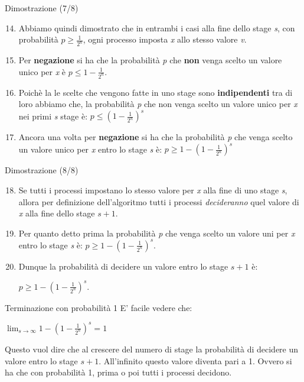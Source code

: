 \documentclass{beamer}
\begin{document}
\begin{frame}{Dimostrazione (7/8)}
    \begin{enumerate}
        \setcounter{enumi}{13}
        \item Abbiamo quindi dimostrato che in entrambi i casi alla fine dello stage \textit{s}, con probabilità $p \geq \frac{1}{2^n}$, ogni processo imposta \textit{x} allo stesso valore \textit{v}.
        \item Per \textbf{negazione} si ha che la probabilità \textit{p} che \textbf{non} venga scelto un valore unico per \textit{x} è $p \leq 1 - \frac{1}{2^n}$.
        \item Poichè la le scelte che vengono fatte in uno stage sono \textbf{indipendenti} tra di loro abbiamo che, la probabilità \textit{p} che non venga scelto un valore unico per \textit{x} nei primi \textit{s} stage è: $p \leq (1 - \frac{1}{2^n})^s$
        \item Ancora una volta per \textbf{negazione} si ha che la probabilità \textit{p} che venga scelto un valore unico per \textit{x} entro lo stage \textit{s} è: $p \geq 1 - (1 - \frac{1}{2^n})^s$ 
    \end{enumerate}
\end{frame}

\begin{frame}{Dimostrazione (8/8)}
    \begin{enumerate}
        \setcounter{enumi}{17}
        \item Se tutti i processi impostano lo stesso valore per \textit{x} alla fine di uno stage \textit{s}, allora per definizione dell'algoritmo tutti i processi \textit{decideranno} quel valore di \textit{x} alla fine dello stage $s + 1$.
        \item Per quanto detto prima la probabilità \textit{p} che venga scelto un valore uni per \textit{x} entro lo stage \textit{s} è: $p \geq 1 - (1 - \frac{1}{2^n})^s$. 
        \item Dunque la probabilità di decidere un valore entro lo stage $s + 1$ è:
        \begin{center}
            \Large
            $p \geq 1 - (1 - \frac{1}{2^n})^s$.
        \end{center}
    \end{enumerate}
\end{frame}

\begin{frame}{Terminazione con probabilità 1}
    E' facile vedere che:
    \begin{center}
        \Large
        $\lim_{s\to\infty} 1 - (1 - \frac{1}{2^n})^s = 1$
    \end{center}
    Questo vuol dire che al crescere del numero di stage la probabilità di decidere un valore entro lo stage $s+1$. \newline \newline
    All'infinito questo valore diventa pari a 1. Ovvero si ha che con probabilità 1, prima o poi tutti i processi decidono.
\end{frame}
\end{document}
